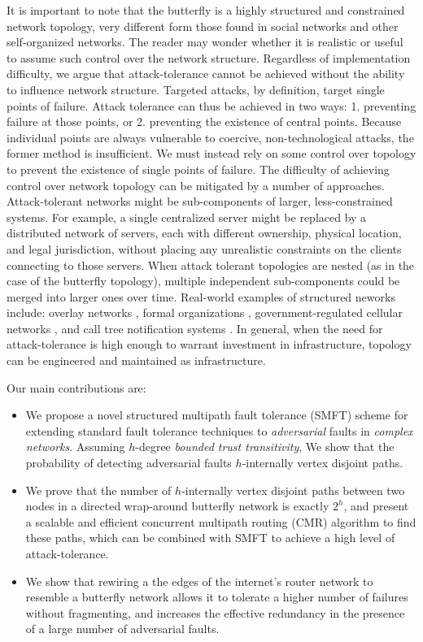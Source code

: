 \documentclass[10pt,letterpaper]{article}
\begin{document}
It is important to note that the butterfly is a highly structured and constrained
network topology,
very different form those found in social networks and other
self-organized networks.
The reader may wonder whether it is realistic or useful to assume such control over
the network structure.
Regardless of implementation difficulty,
we argue that attack-tolerance cannot be achieved without the ability to influence
network structure.
Targeted attacks, by definition, target single points of failure.
Attack tolerance can thus be achieved in two ways: 1. preventing failure at
those points, or 2. preventing the existence of central points.
Because individual points are always vulnerable to coercive, non-technological
attacks, the former method is insufficient.
We must instead rely on some control over topology to prevent the existence of
single points of failure.
The difficulty of achieving control over network topology can be mitigated by
a number of approaches.
Attack-tolerant networks might be sub-components of
larger, less-constrained systems.
For example, a single centralized server might be replaced by a distributed
network of servers,
each with different ownership, physical location, and legal jurisdiction,
without placing any unrealistic constraints on the clients connecting to
those servers.
When attack tolerant topologies are nested (as in the case of the butterfly
topology), multiple independent sub-components could be merged into larger
ones over time.
Real-world examples of structured neworks include: overlay networks
\cite{lua_survey_2005, korzun_structured_2013},
formal organizations \cite{mohr_explaining_1982},
government-regulated cellular networks \cite{walker_mass_2012},
and call tree notification systems \cite{nickerson_thinking_2010}.
In general,
when the need for attack-tolerance is high enough to warrant investment
in infrastructure, topology can be engineered and maintained as infrastructure.

Our main contributions are:
\begin{itemize}
\item{
We propose a novel structured multipath fault tolerance (SMFT) scheme
for extending standard fault tolerance techniques to
{\em adversarial} faults in {\em complex networks}.
Assuming $h$-degree {\em bounded trust transitivity},
We show that the probability of detecting adversarial faults
$h$-internally vertex disjoint paths.
}
\item{We prove that the number of $h$-internally vertex disjoint
paths between two nodes in a directed wrap-around butterfly network
is exactly $2^h$,
and present a scalable and efficient concurrent multipath routing (CMR) algorithm
to find these paths,
which can be combined with SMFT to achieve a high level of attack-tolerance.
}
\item{We show that rewiring a the edges of the internet's router network to
resemble a butterfly network allows it to tolerate a higher number of failures
without fragmenting, and increases the effective redundancy in the presence
of a large number of adversarial faults.}
\end{itemize}
\end{document}
